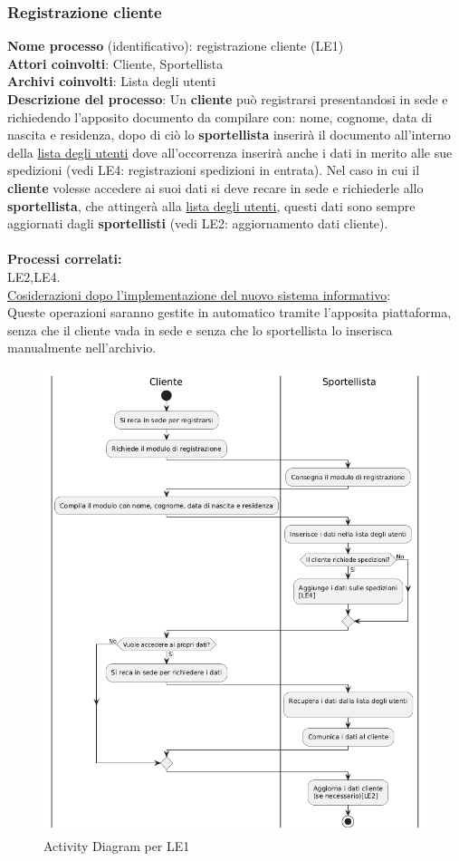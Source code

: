 \documentclass[a4paper,12pt]{article}
\begin{document}
\subsubsection{Registrazione cliente}
\textbf{Nome processo} (identificativo): registrazione cliente (LE1) \\
\textbf{Attori coinvolti}: Cliente, Sportellista \\
\textbf{Archivi coinvolti}: Lista degli utenti \\ 
\textbf{Descrizione del processo}:  Un \textbf{cliente} può registrarsi presentandosi in sede e richiedendo l'apposito documento da compilare con: 
nome, cognome, data di nascita e residenza, dopo di ciò lo \textbf{sportellista} inserirà il documento all'interno della \underline{lista degli utenti} 
dove all'occorrenza inserirà anche i dati in merito alle sue spedizioni (vedi LE4: registrazioni spedizioni in entrata). Nel caso in cui il \textbf{cliente} 
volesse accedere ai suoi dati si deve recare in sede e richiederle allo \textbf{sportellista}, che attingerà alla \underline{lista degli utenti}, questi dati 
sono sempre aggiornati dagli \textbf{sportellisti} (vedi LE2: aggiornamento dati cliente). \\ \\
\textbf{Processi correlati:}\\LE2,LE4.\\ \newline
\underline{Cosiderazioni dopo l'implementazione del nuovo sistema informativo}: \\ Queste operazioni saranno gestite in automatico tramite l'apposita piattaforma, 
senza che il cliente vada in sede e senza che lo sportellista lo inserisca manualmente nell'archivio.
\begin{figure}[H]
	\centering
	\includegraphics[width=0.8\linewidth]{assets/activitydiagram_LE1.png}
	\caption{Activity Diagram per LE1}
\end{figure}
\end{document}
